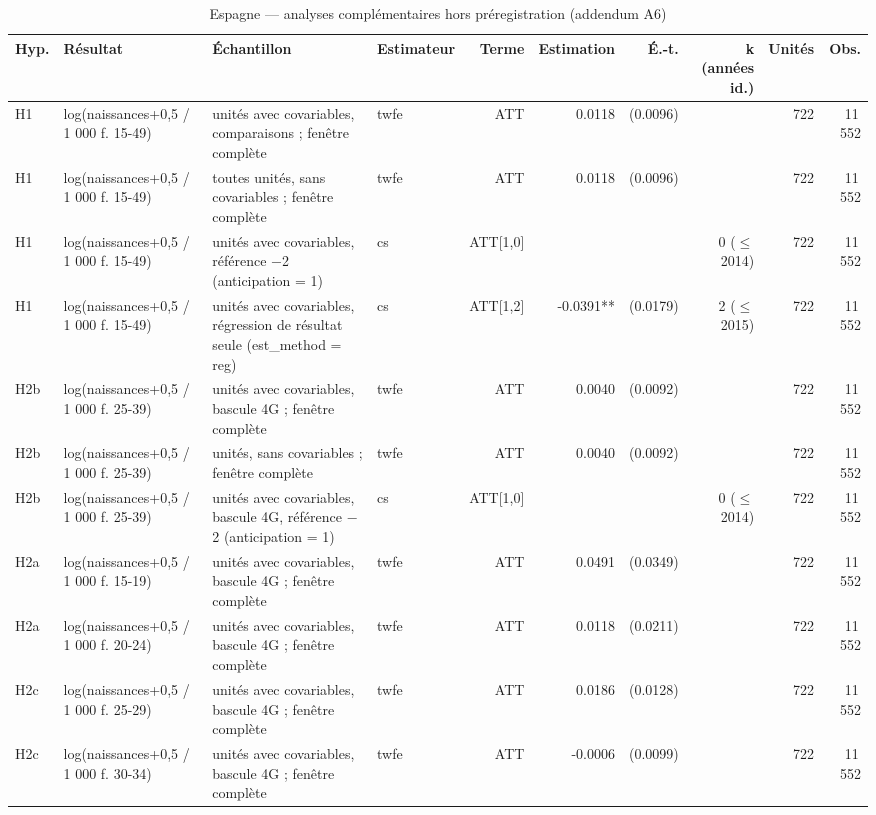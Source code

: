 \begin{table}\centering
\begin{threeparttable}
\caption{Espagne — analyses complémentaires hors préregistration (addendum A6)}\label{tab:es_exploratory}
\scriptsize
\begin{tabular}{lp{5.4cm}p{6.1cm}lrrrrrr}
\toprule
Hyp. & Résultat & Échantillon & Estimateur & Terme & Estimation & É.-t. & k (années id.) & Unités & Obs. \\
\midrule
H1 & log(naissances+0,5 / 1 000 f. 15-49) & unités avec covariables, comparaisons ; fenêtre complète & twfe & ATT & 0.0118 & (0.0096) &  & 722 & 11\,552 \\
H1 & log(naissances+0,5 / 1 000 f. 15-49) & toutes unités, sans covariables ; fenêtre complète & twfe & ATT & 0.0118 & (0.0096) &  & 722 & 11\,552 \\
H1 & log(naissances+0,5 / 1 000 f. 15-49) & unités avec covariables, référence $-$2 (anticipation = 1) & cs & ATT[1,0] &  &  & 0 ($\leq$ 2014) & 722 & 11\,552 \\
H1 & log(naissances+0,5 / 1 000 f. 15-49) & unités avec covariables, régression de résultat seule (est\_method = reg) & cs & ATT[1,2] & -0.0391** & (0.0179) & 2 ($\leq$ 2015) & 722 & 11\,552 \\
H2b & log(naissances+0,5 / 1 000 f. 25-39) & unités avec covariables, bascule 4G ; fenêtre complète & twfe & ATT & 0.0040 & (0.0092) &  & 722 & 11\,552 \\
H2b & log(naissances+0,5 / 1 000 f. 25-39) & unités, sans covariables ; fenêtre complète & twfe & ATT & 0.0040 & (0.0092) &  & 722 & 11\,552 \\
H2b & log(naissances+0,5 / 1 000 f. 25-39) & unités avec covariables, bascule 4G, référence $-$2 (anticipation = 1) & cs & ATT[1,0] &  &  & 0 ($\leq$ 2014) & 722 & 11\,552 \\
H2a & log(naissances+0,5 / 1 000 f. 15-19) & unités avec covariables, bascule 4G ; fenêtre complète & twfe & ATT & 0.0491 & (0.0349) &  & 722 & 11\,552 \\
H2a & log(naissances+0,5 / 1 000 f. 20-24) & unités avec covariables, bascule 4G ; fenêtre complète & twfe & ATT & 0.0118 & (0.0211) &  & 722 & 11\,552 \\
H2c & log(naissances+0,5 / 1 000 f. 25-29) & unités avec covariables, bascule 4G ; fenêtre complète & twfe & ATT & 0.0186 & (0.0128) &  & 722 & 11\,552 \\
H2c & log(naissances+0,5 / 1 000 f. 30-34) & unités avec covariables, bascule 4G ; fenêtre complète & twfe & ATT & -0.0006 & (0.0099) &  & 722 & 11\,552 \\

\end{tabular}
\end{threeparttable}
\end{table}
